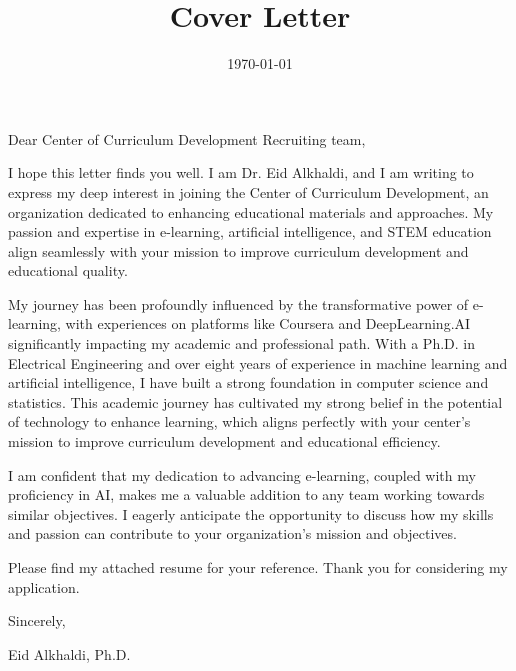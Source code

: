 \documentclass[11pt]{article}
\date{\today}
\title{Cover Letter}
\begin{document}
\maketitle
\noindent
Dear Center of Curriculum Development Recruiting team,
\indent


I hope this letter finds you well. I am Dr. Eid Alkhaldi, and I am writing to express my deep interest in joining the Center of Curriculum Development, an organization dedicated to enhancing educational materials and approaches. My passion and expertise in e-learning, artificial intelligence, and STEM education align seamlessly with your mission to improve curriculum development and educational quality.

My journey has been profoundly influenced by the transformative power of e-learning, with experiences on platforms like Coursera and DeepLearning.AI significantly impacting my academic and professional path. With a Ph.D. in Electrical Engineering and over eight years of experience in machine learning and artificial intelligence, I have built a strong foundation in computer science and statistics. This academic journey has cultivated my strong belief in the potential of technology to enhance learning, which aligns perfectly with your center's mission to improve curriculum development and educational efficiency.

I am confident that my dedication to advancing e-learning, coupled with my proficiency in AI, makes me a valuable addition to any team working towards similar objectives. I eagerly anticipate the opportunity to discuss how my skills and passion can contribute to your organization's mission and objectives.

Please find my attached resume for your reference. Thank you for considering my application.

Sincerely,

Eid Alkhaldi, Ph.D. 
\end{document}
